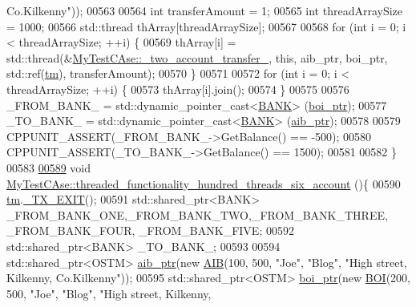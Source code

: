 \begin{DoxyCode}
{       Co.Kilkenny"}));
00563     
00564     \textcolor{keywordtype}{int} transferAmount = 1;
00565     \textcolor{keywordtype}{int} threadArraySize = 1000; 
00566     std::thread thArray[threadArraySize];
00567 
00568     \textcolor{keywordflow}{for} (\textcolor{keywordtype}{int} i = 0; i < threadArraySize; ++i) \{
00569         thArray[i] = std::thread(&\hyperlink{class_my_test_c_ase_af0cc86421d281cc4a583a394ae86dbdd_af0cc86421d281cc4a583a394ae86dbdd}{MyTestCAse::\_two\_account\_transfer\_}, \textcolor{keyword}{
      this}, aib\_ptr, boi\_ptr, std::ref(\hyperlink{class_my_test_c_ase_a422e6e5d4ddedea384be96031c89b72b_a422e6e5d4ddedea384be96031c89b72b}{tm}), transferAmount);
00570     \}
00571     
00572     \textcolor{keywordflow}{for} (\textcolor{keywordtype}{int} i = 0; i < threadArraySize; ++i) \{
00573         thArray[i].join();
00574     \}
00575     
00576     \_FROM\_BANK\_ = std::dynamic\_pointer\_cast<\hyperlink{class_b_a_n_k}{BANK}> (\hyperlink{class_my_test_c_ase_a5554de9e3e6393a89c66c036c529720b_a5554de9e3e6393a89c66c036c529720b}{boi\_ptr});
00577     \_TO\_BANK\_ = std::dynamic\_pointer\_cast<\hyperlink{class_b_a_n_k}{BANK}> (\hyperlink{class_my_test_c_ase_adad50e8278b64aa0321000b528e5362c_adad50e8278b64aa0321000b528e5362c}{aib\_ptr});
00578 
00579     CPPUNIT\_ASSERT(\_FROM\_BANK\_->GetBalance() == -500);
00580     CPPUNIT\_ASSERT(\_TO\_BANK\_->GetBalance() == 1500);
00581     
00582 \}
00583 
\hypertarget{_my_test_c_ase_8cpp_source.tex_l00589}{}\hyperlink{class_my_test_c_ase_acdc0278b6fa7c0102b9e5cdfb68a41a1_acdc0278b6fa7c0102b9e5cdfb68a41a1}{00589} \textcolor{keywordtype}{void} \hyperlink{class_my_test_c_ase_acdc0278b6fa7c0102b9e5cdfb68a41a1_acdc0278b6fa7c0102b9e5cdfb68a41a1}{MyTestCAse::threaded\_functionality\_hundred\_threads\_six\_account}
      ()\{
00590     \hyperlink{class_my_test_c_ase_a422e6e5d4ddedea384be96031c89b72b_a422e6e5d4ddedea384be96031c89b72b}{tm}.\hyperlink{class_t_m_a5e2d1127f2429f2f524d25f430eade06_a5e2d1127f2429f2f524d25f430eade06}{\_TX\_EXIT}();
00591     std::shared\_ptr<BANK> \_FROM\_BANK\_ONE,\_FROM\_BANK\_TWO,\_FROM\_BANK\_THREE, \_FROM\_BANK\_FOUR, \_FROM\_BANK\_FIVE;
00592     std::shared\_ptr<BANK> \_TO\_BANK\_;
00593     
00594     std::shared\_ptr<OSTM> \hyperlink{class_my_test_c_ase_adad50e8278b64aa0321000b528e5362c_adad50e8278b64aa0321000b528e5362c}{aib\_ptr}(\textcolor{keyword}{new} \hyperlink{class_a_i_b}{AIB}(100, 500, \textcolor{stringliteral}{"Joe"}, \textcolor{stringliteral}{"Blog"}, \textcolor{stringliteral}{"High street, Kilkenny,
       Co.Kilkenny"}));
00595     std::shared\_ptr<OSTM> \hyperlink{class_my_test_c_ase_a5554de9e3e6393a89c66c036c529720b_a5554de9e3e6393a89c66c036c529720b}{boi\_ptr}(\textcolor{keyword}{new} \hyperlink{class_b_o_i}{BOI}(200, 500, \textcolor{stringliteral}{"Joe"}, \textcolor{stringliteral}{"Blog"}, \textcolor{stringliteral}{"High street, Kilkenny,
}
\end{DoxyCode}
